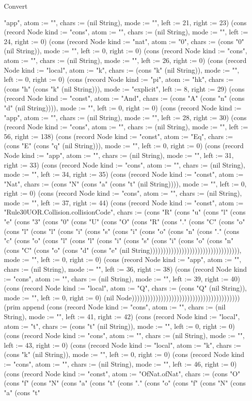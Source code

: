 \begin{lexlean}{Convert}
\begin{semanticmodule}
{"app", atom := "", chars := (nil String), mode := "", left := 21, right := 23}) (cons (record Node {kind := "cons", atom := "", chars := (nil String), mode := "", left := 24, right := 0}) (cons (record Node {kind := "nat", atom := "0", chars := (cons "0" (nil String)), mode := "", left := 0, right := 0}) (cons (record Node {kind := "cons", atom := "", chars := (nil String), mode := "", left := 26, right := 0}) (cons (record Node {kind := "local", atom := "k", chars := (cons "k" (nil String)), mode := "", left := 0, right := 0}) (cons (record Node {kind := "pi", atom := "hk", chars := (cons "h" (cons "k" (nil String))), mode := "explicit", left := 8, right := 29}) (cons (record Node {kind := "const", atom := "And", chars := (cons "A" (cons "n" (cons "d" (nil String)))), mode := "", left := 0, right := 0}) (cons (record Node {kind := "app", atom := "", chars := (nil String), mode := "", left := 28, right := 30}) (cons (record Node {kind := "cons", atom := "", chars := (nil String), mode := "", left := 56, right := 138}) (cons (record Node {kind := "const", atom := "Eq", chars := (cons "E" (cons "q" (nil String))), mode := "", left := 0, right := 0}) (cons (record Node {kind := "app", atom := "", chars := (nil String), mode := "", left := 31, right := 33}) (cons (record Node {kind := "cons", atom := "", chars := (nil String), mode := "", left := 34, right := 35}) (cons (record Node {kind := "const", atom := "Nat", chars := (cons "N" (cons "a" (cons "t" (nil String)))), mode := "", left := 0, right := 0}) (cons (record Node {kind := "cons", atom := "", chars := (nil String), mode := "", left := 37, right := 44}) (cons (record Node {kind := "const", atom := "Rule30UOR.Collision.collisionCode", chars := (cons "R" (cons "u" (cons "l" (cons "e" (cons "3" (cons "0" (cons "U" (cons "O" (cons "R" (cons "." (cons "C" (cons "o" (cons "l" (cons "l" (cons "i" (cons "s" (cons "i" (cons "o" (cons "n" (cons "." (cons "c" (cons "o" (cons "l" (cons "l" (cons "i" (cons "s" (cons "i" (cons "o" (cons "n" (cons "C" (cons "o" (cons "d" (cons "e" (nil String)))))))))))))))))))))))))))))))))), mode := "", left := 0, right := 0}) (cons (record Node {kind := "app", atom := "", chars := (nil String), mode := "", left := 36, right := 38}) (cons (record Node {kind := "cons", atom := "", chars := (nil String), mode := "", left := 39, right := 40}) (cons (record Node {kind := "local", atom := "Q", chars := (cons "Q" (nil String)), mode := "", left := 0, right := 0}) (nil Node))))))))))))))))))))))))))))))))))))))))) (prim append (cons (record Node {kind := "cons", atom := "", chars := (nil String), mode := "", left := 41, right := 42}) (cons (record Node {kind := "local", atom := "t", chars := (cons "t" (nil String)), mode := "", left := 0, right := 0}) (cons (record Node {kind := "cons", atom := "", chars := (nil String), mode := "", left := 43, right := 0}) (cons (record Node {kind := "local", atom := "k", chars := (cons "k" (nil String)), mode := "", left := 0, right := 0}) (cons (record Node {kind := "cons", atom := "", chars := (nil String), mode := "", left := 46, right := 0}) (cons (record Node {kind := "const", atom := "OfNat.ofNat", chars := (cons "O" (cons "f" (cons "N" (cons "a" (cons "t" (cons "." (cons "o" (cons "f" (cons "N" (cons "a" (cons "t" }
\end{semanticmodule}
\end{lexlean}

